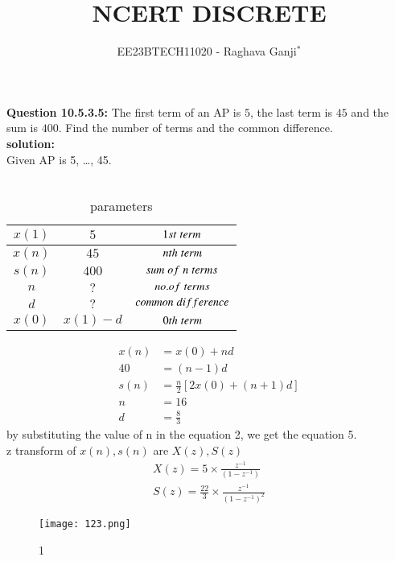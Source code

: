 \documentclass[journal,12pt,twocolumn]{IEEEtran}
\theoremstyle{remark}
\begin{document}

\vspace{3cm}

\title{NCERT DISCRETE}
\author{EE23BTECH11020 - Raghava Ganji$^{*}$%
}
\maketitle
\newpage
\bigskip

\renewcommand{\thefigure}{\theenumi}
\renewcommand{\thetable}{\theenumi}

\textbf{Question 10.5.3.5:}
The first term of an AP is $5$, the last term is $45$ and the sum is $400$. Find the number of terms and the common difference.\\
\textbf{solution:}\\
Given AP is 5, \ldots, 45.\\\\
\begin{table}[h]
\centering
\begin{tabular}{|c|c|c|}\hline
$x(1)$ & $5$ & $ 1st\hspace{1mm}term$\\ \hline
$x(n)$ & $45$ & $nth\hspace{1mm}term$\\ \hline
$s(n)$ & $400$ & $sum\hspace{1mm}of\hspace{1mm}n\hspace{1mm}terms$\\ \hline
$n$ & $?$ & $no.of\hspace{1mm}terms$\\ \hline
$d$ & $?$ & $common\hspace{1mm}difference$\\ \hline
$x(0)$ & $x(1)-d$ & $0th\hspace{1mm}term$\\ \hline
\end{tabular}
\caption{parameters}
\end{table}
\begin{align}
x(n)&=x(0)+nd\\
40&=(n-1)d\\
s(n)&=\frac{n}{2} [2x(0)+(n+1)d]\\
n&=16\\
d&=\frac{8}{3}
\end{align}
by substituting the value of n in the equation 2, we get the equation 5.\\
z transform of $x(n),s(n)$ are $X(z),S(z)$
\begin{align}
X(z)=5\times \frac{z^{-1}}{(1-z^{-1})}\\
S(z)=\frac{22}{3} \times \frac{z^{-1}}{(1-z^{-1})^2}
\end{align}
\renewcommand\thefigure{1}
\begin{figure}[h]
    \centering
    \texttt{[image: 123.png]}
    \caption{1}
    \label{fig:enter-label}
\end{figure}
\end{document}

